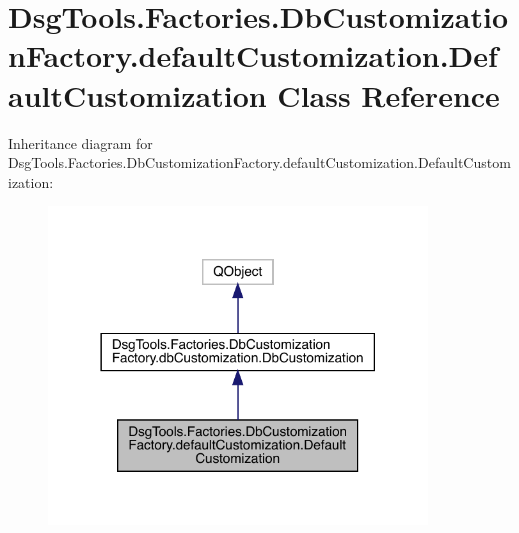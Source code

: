 \hypertarget{class_dsg_tools_1_1_factories_1_1_db_customization_factory_1_1default_customization_1_1_default_customization}{}\section{Dsg\+Tools.\+Factories.\+Db\+Customization\+Factory.\+default\+Customization.\+Default\+Customization Class Reference}
\label{class_dsg_tools_1_1_factories_1_1_db_customization_factory_1_1default_customization_1_1_default_customization}


Inheritance diagram for Dsg\+Tools.\+Factories.\+Db\+Customization\+Factory.\+default\+Customization.\+Default\+Customization\+:
\nopagebreak
\begin{figure}[H]
\begin{center}
\leavevmode
\includegraphics[width=285pt]{class_dsg_tools_1_1_factories_1_1_db_customization_factory_1_1default_customization_1_1_default_customization__inherit__graph}
\end{center}
\end{figure}


